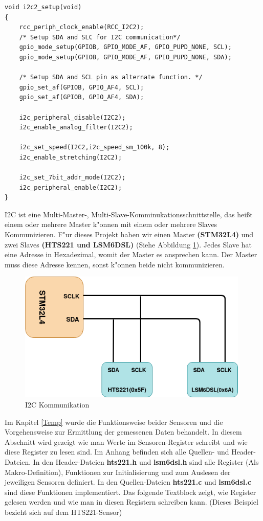 \begin{lstlisting}[frame=single]
void i2c2_setup(void)
{
	rcc_periph_clock_enable(RCC_I2C2);
	/* Setup SDA and SLC for I2C communication*/
	gpio_mode_setup(GPIOB, GPIO_MODE_AF, GPIO_PUPD_NONE, SCL);
	gpio_mode_setup(GPIOB, GPIO_MODE_AF, GPIO_PUPD_NONE, SDA);

	/* Setup SDA and SCL pin as alternate function. */
	gpio_set_af(GPIOB, GPIO_AF4, SCL);
	gpio_set_af(GPIOB, GPIO_AF4, SDA);

	i2c_peripheral_disable(I2C2);
	i2c_enable_analog_filter(I2C2);

	i2c_set_speed(I2C2,i2c_speed_sm_100k, 8);
	i2c_enable_stretching(I2C2);

	i2c_set_7bit_addr_mode(I2C2);
	i2c_peripheral_enable(I2C2);
}

\end{lstlisting}

I2C ist eine Multi-Master-, Multi-Slave-Komminukationsschnittstelle, 
das hei\ss{}t einem oder mehrere Master k"onnen mit einem oder mehrere 
Slaves  Kommunizieren. F"ur dieses Projekt haben wir einen Master 
\textbf{(STM32L4)} und zwei Slaves  \textbf{(HTS221 und LSM6DSL)} 
(Siehe Abbildung \ref{fig:I2C}). 
Jedes Slave hat eine Adresse in Hexadezimal, womit der Master es 
ansprechen kann. Der Master muss diese Adresse kennen, sonst k"onnen 
beide nicht kommunizieren. 

\begin{figure}[h]
	\centering
	\includegraphics[width=11cm]{source/images/I2C}
	\caption{I2C Kommunikation\label{fig:I2C}}
\end{figure}

\vspace{10cm}
Im Kapitel \ref{Temp} wurde die Funktionsweise beider Sensoren und die 
Vorgehensweise zur Ermittlung der gemessenen Daten behandelt. In diesem 
Abschnitt wird gezeigt wie man Werte im Sensoren-Register schreibt und
wie diese Register zu lesen sind. Im Anhang befinden sich alle Quellen- 
und Header-Dateien. In den Header-Dateien \textbf{hts221.h} und 
\textbf{lsm6dsl.h} sind alle Register (Als Makro-Definition), 
Funktionen zur Initialisierung und zum Auslesen der jeweiligen Sensoren 
definiert. In den Quellen-Dateien \textbf{hts221.c} und 
\textbf{lsm6dsl.c} sind diese Funktionen implementiert. Das folgende 
Textblock zeigt, wie Register gelesen werden und wie man in diesen 
Registern schreiben kann. (Dieses Beispiel bezieht sich auf dem 
HTS221-Sensor)

